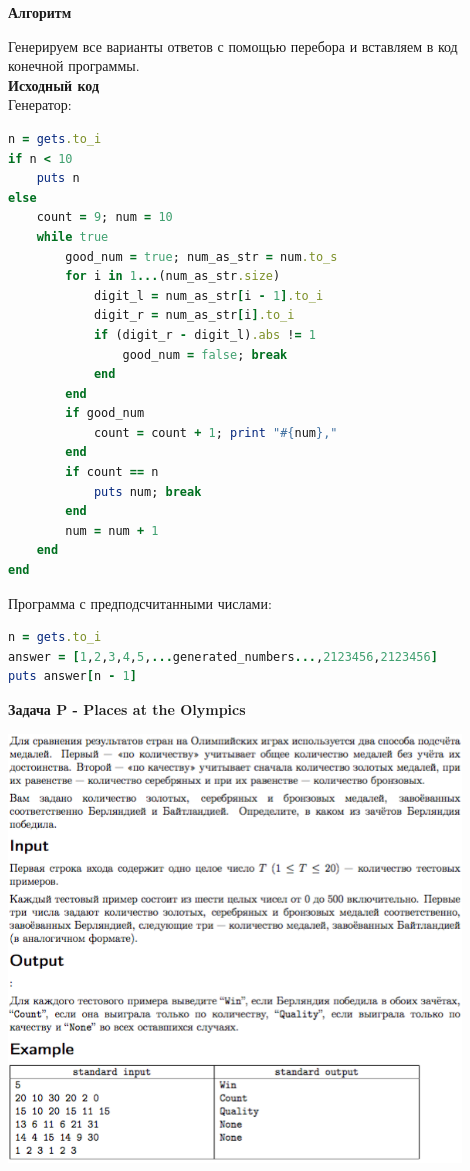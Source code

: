 \documentclass[a4paper,12pt]{article}
\begin{document}
\textbf{{\large Алгоритм}}

Генерируем все варианты ответов с помощью перебора и вставляем в код конечной программы. \\

\textbf{{\large Исходный код}} \\
Генератор:
\begin{lstlisting}[language=Ruby]
n = gets.to_i
if n < 10
    puts n
else
    count = 9; num = 10
    while true
        good_num = true; num_as_str = num.to_s
        for i in 1...(num_as_str.size)
            digit_l = num_as_str[i - 1].to_i
            digit_r = num_as_str[i].to_i
            if (digit_r - digit_l).abs != 1
                good_num = false; break
            end
        end
        if good_num
            count = count + 1; print "#{num},"
        end
        if count == n
            puts num; break
        end
        num = num + 1
    end
end
\end{lstlisting}
Программа с предподсчитанными числами:
\begin{lstlisting}[language=Ruby]
n = gets.to_i
answer = [1,2,3,4,5,...generated_numbers...,2123456,2123456]
puts answer[n - 1]
\end{lstlisting}


\newpage
\textbf{{\large Задача P - Places at the Olympics}}

\begin{center}
\includegraphics[width=0.9\textwidth]{OC_Bashkortostan/P.png}\\ [1cm]
\end{center}
\end{document}
